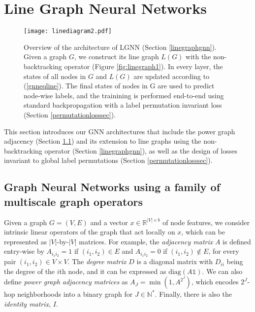 \documentclass{article} \usepackage{iclr2019_conference,times}
\begin{document}
 
    

 

\section{Line Graph Neural Networks}
\label{gnnsec}

\begin{figure}[ht]
    \centering
{{\texttt{[image: linediagram2.pdf]}}}
        \caption{Overview of the architecture of LGNN (Section \ref{linegraphgnn}). Given a graph $G$, we construct its line graph $L(G)$ with the non-backtracking operator (Figure \ref{fig:linegraph1}). In every layer, the states of all nodes in $G$ and $L(G)$ are updated according to (\ref{gnneqline}). The final states of nodes in G are used to predict node-wise labels, and the trainining is performed end-to-end using standard backpropagation with a label permutation invariant loss (Section \ref{permutationlosssec}).}
    \label{fig:model}
\end{figure}

This section introduces our GNN architectures that include the power graph adjacency (Section \ref{GNNbasic}) and 
its extension to line graphs using the non-backtracking operator (Section \ref{linegraphgnn}), as 
well as the design of losses invariant to global label permutations (Section \ref{permutationlosssec}).



\subsection{Graph Neural Networks using a family of multiscale graph operators}
\label{GNNbasic}
Given a graph $G = (V, E)$ and a vector $x \in \mathbb{R}^{|V| \times b}$ of node features, we consider intrinsic linear operators of the graph that act locally on $x$, which can be represented as $|V|$-by-$|V|$ matrices. For example, the \textit{adjacency matrix} $A$ is defined entry-wise by $A_{i_1 i_2} = 1$ if $(i_1, i_2) \in E$ and $A_{i_1 i_2} = 0$ if $(i_1, i_2) \notin E$, for every pair $(i_1, i_2) \in V \times V$. The \textit{degree matrix} $D$ is a diagonal matrix with $D_{ii}$ being the degree of the $i$th node, and it can be expressed as $\text{diag}( A {\mathds 1})$. We can also define \textit{power graph adjacency matrices} as $A_{J} = \min(1, A^{2^J})$, which encodes $2^J$-hop neighborhoods into a binary graph for $J \in \mathbb{N}^*$. Finally, there is also the \textit{identity matrix}, $I$. 
\end{document}
